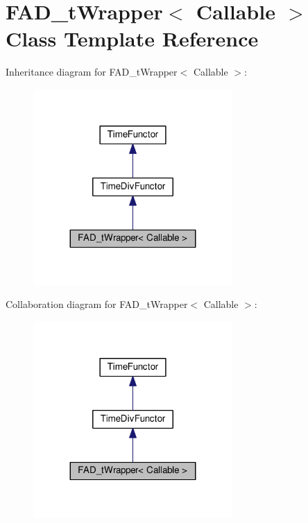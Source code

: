 \hypertarget{classFAD__tWrapper}{}\section{F\+A\+D\+\_\+t\+Wrapper$<$ Callable $>$ Class Template Reference}
\label{classFAD__tWrapper}


Inheritance diagram for F\+A\+D\+\_\+t\+Wrapper$<$ Callable $>$\+:\nopagebreak
\begin{figure}[H]
\begin{center}
\leavevmode
\includegraphics[width=215pt]{classFAD__tWrapper__inherit__graph}
\end{center}
\end{figure}


Collaboration diagram for F\+A\+D\+\_\+t\+Wrapper$<$ Callable $>$\+:\nopagebreak
\begin{figure}[H]
\begin{center}
\leavevmode
\includegraphics[width=215pt]{classFAD__tWrapper__coll__graph}
\end{center}
\end{figure}
